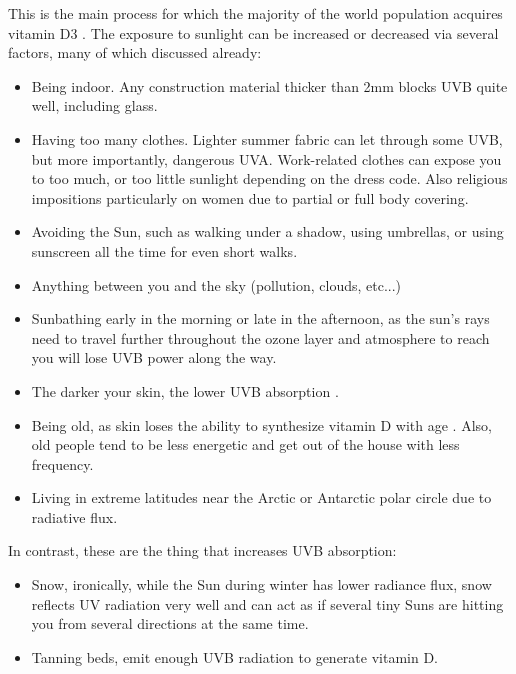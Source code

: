 This is the main process for which the majority of the world population acquires vitamin D3 \cite{1_Institute_of_Medicine2011-zg}. The exposure to sunlight can be increased or decreased via several factors, many of which discussed already:\vspace{3 mm}

\begin{itemize}
    
    \item Being indoor. Any construction material thicker than 2mm blocks UVB quite well, including glass.
    
    \item Having too many clothes. Lighter summer fabric can let through some UVB, but more importantly, dangerous UVA. Work-related clothes can expose you to too much, or too little sunlight depending on the dress code. Also religious impositions particularly on women due to partial or full body covering.
    
    \item Avoiding the Sun, such as walking under a shadow, using umbrellas, or using sunscreen all the time for even short walks.
    
    \item Anything between you and the sky (pollution, clouds, etc...)
    
    \item Sunbathing early in the morning or late in the afternoon, as the sun's rays need to travel further throughout the ozone layer and atmosphere to reach you will lose UVB power along the way.
    
    \item The darker your skin, the lower UVB absorption \cite{Hartono2023}.
    
    \item Being old, as skin loses the ability to synthesize vitamin D with age \cite{ref:Chalcraft2020}. Also, old people tend to be less energetic and get out of the house with less frequency.
    
    \item Living in extreme latitudes near the Arctic or Antarctic polar circle due to radiative flux.

\end{itemize}

In contrast, these are the thing that increases UVB absorption:

\begin{itemize}

    \item Snow, ironically, while the Sun during winter has lower radiance flux, snow reflects UV radiation very well and can act as if several tiny Suns are hitting you from several directions at the same time.
     
    \item Tanning beds, emit enough UVB radiation to generate vitamin D.
 
\end{itemize}
   

